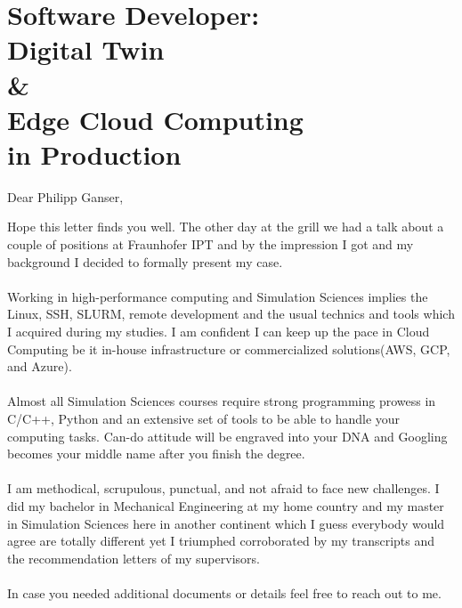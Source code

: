\section{Software Developer: \\Digital Twin \\ \hspace*{3em}\& \\Edge Cloud Computing \\in Production}
Dear Philipp Ganser,

Hope this letter finds you well. The other day at the grill we had a talk about a couple of positions at Fraunhofer IPT and by the
impression I got and my background I decided to formally present my case.\\\\
Working in high-performance computing and Simulation Sciences implies the Linux, SSH, SLURM, remote development
 and the usual technics and tools which I acquired during my studies. I am confident I can keep up the pace in Cloud Computing 
 be it in-house infrastructure or commercialized solutions(AWS, GCP, and Azure).\\\\
 Almost all Simulation Sciences courses require strong programming prowess in C/C++, Python and an extensive set of 
 tools to be able to handle your computing tasks. Can-do attitude will be engraved into your DNA and Googling becomes 
 your middle name after you finish the degree.\\\\
 I am methodical, scrupulous, punctual, and not afraid to face new challenges. I did my bachelor in 
 Mechanical Engineering at my home country and my master in Simulation Sciences here in another continent 
 which I guess everybody would agree are totally different yet I triumphed corroborated by my transcripts and 
 the recommendation letters of my supervisors.\\\\  
 In case you needed additional documents or details feel free to reach out to me.


